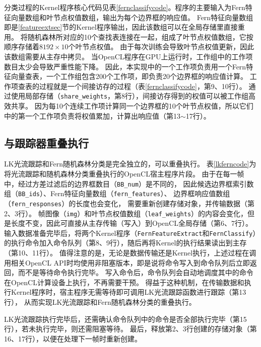 分类过程的Kernel程序核心代码见表\ref{fernclassifycode}。程序的主要输入为Fern特征向量数组和叶节点权值数组，输出为每个边界框的响应值。
Fern特征向量数组即是\ref{featureextsec}节的Kernel程序输出，因此该数组可以在全局存储里直接重用。
将随机森林所对应的10个查找表连接在一起，组成了叶节点权值数组，它按顺序存储着$8192\times10$个叶节点权值。
由于每次训练会导致叶节点权值更新，因此该数组需要从主存中拷贝。
当OpenCL程序在GPU上运行时，工作组中的工作项数目太少会导致严重性能下降。
因此，本实现中的一个工作项负责用一个Fern特征向量查表，一个工作组包含200个工作项，即负责20个边界框的响应值计算。
工作项查表的过程就是一个间接访存的过程（表\ref{fernclassifycode}，第9、10行）。
通过使用局部存储（\texttt{share\_weights}，第8行），间接访存得到的权值可以被工作组高效共享。
因为每10个连续工作项计算同一个边界框的10个叶节点权值，所以它们中的第一个工作项负责将权值累加，计算出响应值（第13$\sim$17行）。

\subsection{与跟踪器重叠执行}
\label{detecttrackoverlapsec}
LK光流跟踪和Fern随机森林分类是完全独立的，可以重叠执行。
表\ref{lkferncode}为将光流跟踪和随机森林分类重叠执行的OpenCL宿主程序片段。
由于在每一帧中，经过方差过滤后的边界框数目（\texttt{BB\_num}）是不同的，
因此候选边界框索引数组（\texttt{BB\_ids}）、Fern特征向量数组（\texttt{fern\_features}）、
边界框响应值数组（\texttt{fern\_responses}）的长度也会变化，
需要重新创建存储对象，并传输数据（第2、3行）。
帧图像（\texttt{img}）和叶节点权值数组（\texttt{leaf\_weights}）的内容会变化，但是长度不变，因此可直接从主存传输（写入）到OpenCL全局存储（第6、7行）。
输入数据准备完毕后，将两个Kernel程序（\texttt{FernFeatureExtract}和\texttt{FernClassify}）的执行命令加入命令队列（第8、9行），随后再将Kernel的执行结果读出到主存（第10、11行）。
值得注意的是，无论是数据传输还是Kernel执行，上述过程在调用相关OpenCL API时均使用非阻塞版本，即是说将命令写入到命令队列后立即返回，而不是等待命令执行完毕。
写入命令后，命令队列会自动地调度其中的命令在OpenCL计算设备上执行，不再需要干预。
得益于这种机制，在传输数据和执行Kernel程序时，宿主程序无需等待即可调用LK光流跟踪函数进行跟踪（第13行），
从而实现LK光流跟踪和Fern随机森林分类的重叠执行。

LK光流跟踪执行完毕后，还需确认命令队列中的命令是否全部执行完毕（第15行），若未执行完毕，则还需阻塞等待。
最后，释放第2、3行创建的存储对象（第16、17行），以便在处理下一帧时重新创建。


